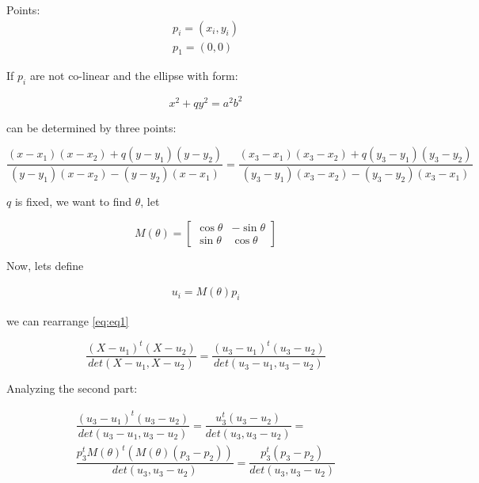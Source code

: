 \documentclass{article}
\begin{document}
	Points:
\begin{equation}
\begin{split}
	p_i = (x_i, y_i)\\
	p_1 = (0,0)
\end{split}
\end{equation}

If $p_i$ are not co-linear and the ellipse with form:

\begin{equation}
x^2 + qy^2 = a^2b^2
\end{equation}

can be determined by three points:

\begin{equation}\label{eq:eq1}
\dfrac{(x-x_1)(x - x_2) + q(y-y_1)(y-y_2)}{(y-y_1)(x-x_2)-(y-y_2)(x-x_1)} = 	\dfrac{(x_3-x_1)(x_3 - x_2) + q(y_3-y_1)(y_3-y_2)}{(y_3-y_1)(x_3-x_2)-(y_3-y_2)(x_3-x_1)}
\end{equation}

$q$ is fixed, we want to find $\theta$, let

\begin{equation}
M(\theta) = \left[\begin{array}{cc} \cos{\theta} & -\sin{\theta}\\ \sin{\theta} & \cos{\theta}\end{array}\right]
\end{equation}

Now, lets define

\begin{eqnarray}
u_i = M(\theta)p_i
\end{eqnarray}

we can rearrange \ref{eq:eq1}

\begin{equation}
\dfrac{(X-u_1)^t(X-u_2)}{det(X-u_1, X-u_2)} = \dfrac{(u_3-u_1)^t(u_3-u_2)}{det(u_3-u_1, u_3-u_2)}
\end{equation}

Analyzing the second part:

\begin{equation}
\begin{split}
\dfrac{(u_3-u_1)^t(u_3-u_2)}{det(u_3-u_1, u_3-u_2)} = \dfrac{u_3^t(u_3-u_2)}{det(u_3, u_3-u_2)} = \\
\dfrac{p_3^tM(\theta)^t(M(\theta)(p_3-p_2))}{det(u_3, u_3-u_2)}=\dfrac{p_3^t(p_3-p_2)}{det(u_3, u_3-u_2)}
\end{split}
\end{equation}
\end{document}
